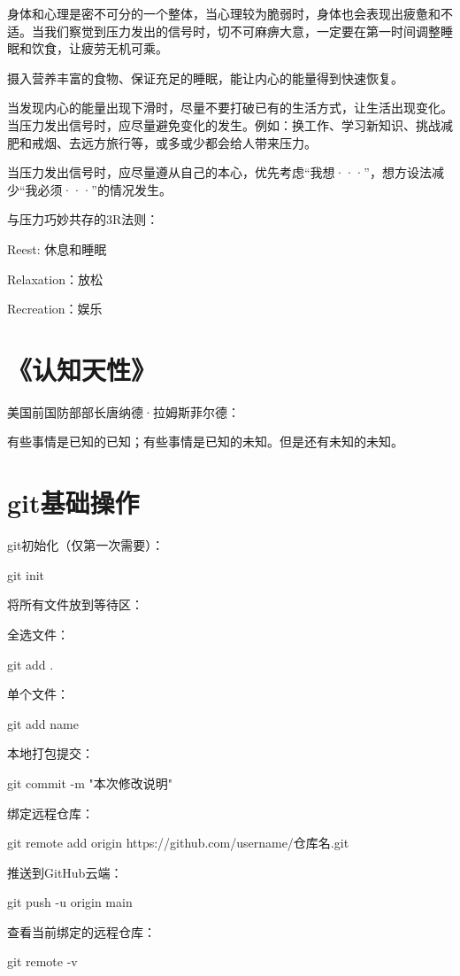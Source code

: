 \documentclass[12pt,a4paper]{article}
\begin{document}
身体和心理是密不可分的一个整体，当心理较为脆弱时，身体也会表现出疲惫和不适。当我们察觉到压力发出的信号时，切不可麻痹大意，一定要在第一时间调整睡眠和饮食，让疲劳无机可乘。

摄入营养丰富的食物、保证充足的睡眠，能让内心的能量得到快速恢复。

当发现内心的能量出现下滑时，尽量不要打破已有的生活方式，让生活出现变化。当压力发出信号时，应尽量避免变化的发生。例如：换工作、学习新知识、挑战减肥和戒烟、去远方旅行等，或多或少都会给人带来压力。

当压力发出信号时，应尽量遵从自己的本心，优先考虑“我想···”，想方设法减少“我必须···”的情况发生。

与压力巧妙共存的3R法则：

Reest: 休息和睡眠

Relaxation：放松

Recreation：娱乐




\section*{《认知天性》}

美国前国防部部长唐纳德·拉姆斯菲尔德：

有些事情是已知的已知；有些事情是已知的未知。但是还有未知的未知。








\section*{git基础操作}
git初始化（仅第一次需要）：\par
git init\par
将所有文件放到等待区：\par
全选文件：\par
git add .\par
单个文件：\par
git add name\par
本地打包提交：\par
git commit -m "本次修改说明"\par
绑定远程仓库：\par
git remote add origin https://github.com/username/仓库名.git\par
推送到GitHub云端：\par
git push -u origin main

查看当前绑定的远程仓库：\par
git remote -v\par
\end{document}

